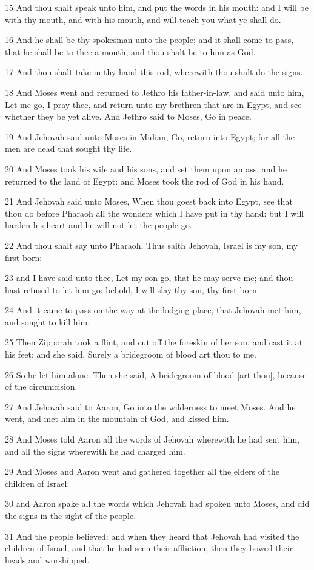 \par 15 And thou shalt speak unto him, and put the words in his mouth: and I will be with thy mouth, and with his mouth, and will teach you what ye shall do.
\par 16 And he shall be thy spokesman unto the people; and it shall come to pass, that he shall be to thee a mouth, and thou shalt be to him as God.
\par 17 And thou shalt take in thy hand this rod, wherewith thou shalt do the signs.
\par 18 And Moses went and returned to Jethro his father-in-law, and said unto him, Let me go, I pray thee, and return unto my brethren that are in Egypt, and see whether they be yet alive. And Jethro said to Moses, Go in peace.
\par 19 And Jehovah said unto Moses in Midian, Go, return into Egypt; for all the men are dead that sought thy life.
\par 20 And Moses took his wife and his sons, and set them upon an ass, and he returned to the land of Egypt: and Moses took the rod of God in his hand.
\par 21 And Jehovah said unto Moses, When thou goest back into Egypt, see that thou do before Pharaoh all the wonders which I have put in thy hand: but I will harden his heart and he will not let the people go.
\par 22 And thou shalt say unto Pharaoh, Thus saith Jehovah, Israel is my son, my first-born:
\par 23 and I have said unto thee, Let my son go, that he may serve me; and thou hast refused to let him go: behold, I will slay thy son, thy first-born.
\par 24 And it came to pass on the way at the lodging-place, that Jehovah met him, and sought to kill him.
\par 25 Then Zipporah took a flint, and cut off the foreskin of her son, and cast it at his feet; and she said, Surely a bridegroom of blood art thou to me.
\par 26 So he let him alone. Then she said, A bridegroom of blood [art thou], because of the circumcision.
\par 27 And Jehovah said to Aaron, Go into the wilderness to meet Moses. And he went, and met him in the mountain of God, and kissed him.
\par 28 And Moses told Aaron all the words of Jehovah wherewith he had sent him, and all the signs wherewith he had charged him.
\par 29 And Moses and Aaron went and gathered together all the elders of the children of Israel:
\par 30 and Aaron spake all the words which Jehovah had spoken unto Moses, and did the signs in the sight of the people.
\par 31 And the people believed: and when they heard that Jehovah had visited the children of Israel, and that he had seen their affliction, then they bowed their heads and worshipped.


